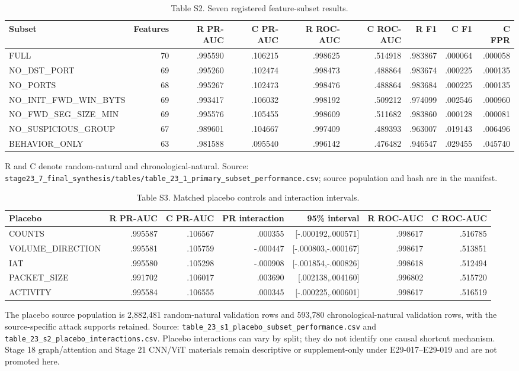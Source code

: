 \documentclass[preprint,12pt]{elsarticle}
\begin{document}
\begin{table}[htbp]
\centering\tiny
\caption{Table S2. Seven registered feature-subset results.}
\begin{tabular}{@{}lrrrrrrrr@{}}
\toprule
Subset & Features & R PR-AUC & C PR-AUC & R ROC-AUC & C ROC-AUC & R F1 & C F1 & C FPR\\
\midrule
FULL & 70 & .995590 & .106215 & .998625 & .514918 & .983867 & .000064 & .000058\\
NO\_DST\_PORT & 69 & .995260 & .102474 & .998473 & .488864 & .983674 & .000225 & .000135\\
NO\_PORTS & 68 & .995267 & .102473 & .998476 & .488864 & .983684 & .000225 & .000135\\
NO\_INIT\_FWD\_WIN\_BYTS & 69 & .993417 & .106032 & .998192 & .509212 & .974099 & .002546 & .000960\\
NO\_FWD\_SEG\_SIZE\_MIN & 69 & .995576 & .105455 & .998609 & .511682 & .983860 & .000128 & .000081\\
NO\_SUSPICIOUS\_GROUP & 67 & .989601 & .104667 & .997409 & .489393 & .963007 & .019143 & .006496\\
BEHAVIOR\_ONLY & 63 & .981588 & .095540 & .996142 & .476482 & .946547 & .029455 & .045740\\
\bottomrule
\end{tabular}
\end{table}
R and C denote random-natural and chronological-natural. Source: \texttt{stage23\_7\_final\_synthesis/tables/table\_23\_1\_primary\_subset\_performance.csv}; source population and hash are in the manifest.

\begin{table}[htbp]
\centering\tiny
\caption{Table S3. Matched placebo controls and interaction intervals.}
\begin{tabular}{@{}lrrrrrr@{}}
\toprule
Placebo & R PR-AUC & C PR-AUC & PR interaction & 95\% interval & R ROC-AUC & C ROC-AUC\\
\midrule
COUNTS & .995587 & .106567 & .000355 & [-.000192,.000571] & .998617 & .516785\\
VOLUME\_DIRECTION & .995581 & .105759 & -.000447 & [-.000803,-.000167] & .998617 & .513851\\
IAT & .995580 & .105298 & -.000908 & [-.001854,-.000826] & .998618 & .512494\\
PACKET\_SIZE & .991702 & .106017 & .003690 & [.002138,.004160] & .996802 & .515720\\
ACTIVITY & .995584 & .106555 & .000345 & [-.000225,.000601] & .998617 & .516519\\
\bottomrule
\end{tabular}
\end{table}
The placebo source population is 2,882,481 random-natural validation rows and 593,780 chronological-natural validation rows, with the source-specific attack supports retained. Source: \texttt{table\_23\_s1\_placebo\_subset\_performance.csv} and \texttt{table\_23\_s2\_placebo\_interactions.csv}. Placebo interactions can vary by split; they do not identify one causal shortcut mechanism. Stage 18 graph/attention and Stage 21 CNN/ViT materials remain descriptive or supplement-only under E29-017--E29-019 and are not promoted here.
\end{document}
